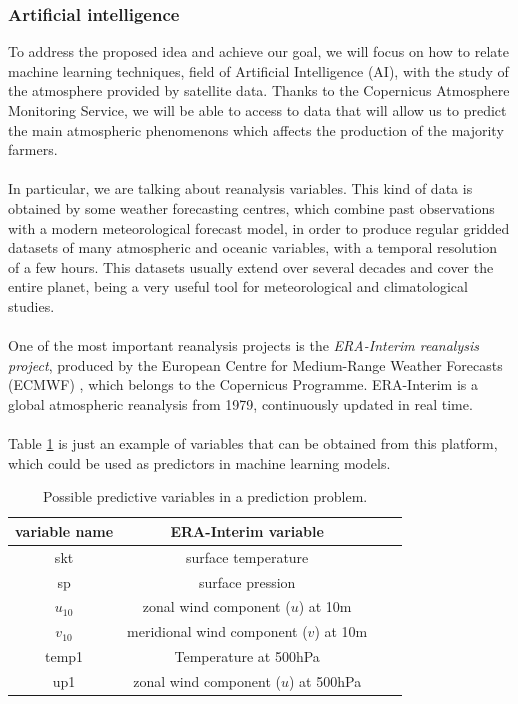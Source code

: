\subsubsection{Artificial intelligence}
To address the proposed idea and achieve our goal, we will focus on how to relate machine learning techniques, field of Artificial Intelligence (AI), with the study of the atmosphere provided by satellite data. Thanks to the Copernicus Atmosphere Monitoring Service, we will be able to access to data that will allow us to predict the main atmospheric phenomenons which affects the production of the majority farmers.\\\\
%
In particular, we are talking about reanalysis variables. This kind of data is obtained by some weather forecasting centres, which combine past observations with a modern meteorological forecast model, in order to produce regular gridded datasets of many atmospheric and oceanic variables, with a temporal resolution of a few hours. This datasets usually extend over several decades and cover the entire planet, being a very useful tool for meteorological and climatological studies.\\\\
%
One of the most important reanalysis projects is the {\em ERA-Interim reanalysis project}, produced by the European Centre for Medium-Range Weather Forecasts (ECMWF) \cite{ERA_Interim}, which belongs to the Copernicus Programme. ERA-Interim is a global atmospheric reanalysis from 1979, continuously updated in real time.\\\\
%
Table \ref{Variables_ERA} is just an example of variables that can be obtained from this platform, which could be used as predictors in machine learning models.

\vspace{12pt}
\begin{table}[H]
\begin{center}
\caption{\label{Variables_ERA} Possible predictive variables in a prediction problem.}
\begin{tabular}{cccc}
\hline
variable name & ERA-Interim variable\\
\hline
\hline
skt & surface temperature\\
sp & surface pression\\
$u_{10}$& zonal wind component ($u$) at 10m\\
$v_{10}$& meridional wind component ($v$) at 10m\\
temp1& Temperature at 500hPa\\
up1& zonal wind component ($u$) at 500hPa\\
\hline
\end{tabular}
\end{center}
\end{table}
\vspace{12pt}


